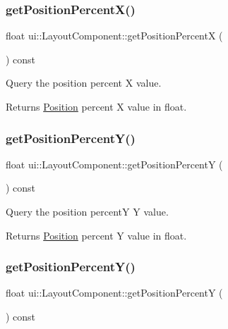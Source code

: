 \subsubsection{\texorpdfstring{get\+Position\+Percent\+X()}{getPositionPercentX()}\hspace{0.1cm}{\footnotesize\ttfamily [2/2]}}
{\footnotesize\ttfamily float ui\+::\+Layout\+Component\+::get\+Position\+PercentX (\begin{DoxyParamCaption}{ }\end{DoxyParamCaption}) const}

Query the position percent X value. \begin{DoxyReturn}{Returns}
\hyperlink{structPosition}{Position} percent X value in float. 
\end{DoxyReturn}
\mbox{\label{classui_1_1LayoutComponent_a3a997e5b6296efbbe01ca923b8dcf7b4}} 
\subsubsection{\texorpdfstring{get\+Position\+Percent\+Y()}{getPositionPercentY()}\hspace{0.1cm}{\footnotesize\ttfamily [1/2]}}
{\footnotesize\ttfamily float ui\+::\+Layout\+Component\+::get\+Position\+PercentY (\begin{DoxyParamCaption}{ }\end{DoxyParamCaption}) const}

Query the position percentY Y value. \begin{DoxyReturn}{Returns}
\hyperlink{structPosition}{Position} percent Y value in float. 
\end{DoxyReturn}
\mbox{\label{classui_1_1LayoutComponent_a3a997e5b6296efbbe01ca923b8dcf7b4}} 
\subsubsection{\texorpdfstring{get\+Position\+Percent\+Y()}{getPositionPercentY()}\hspace{0.1cm}{\footnotesize\ttfamily [2/2]}}
{\footnotesize\ttfamily float ui\+::\+Layout\+Component\+::get\+Position\+PercentY (\begin{DoxyParamCaption}{ }\end{DoxyParamCaption}) const}

